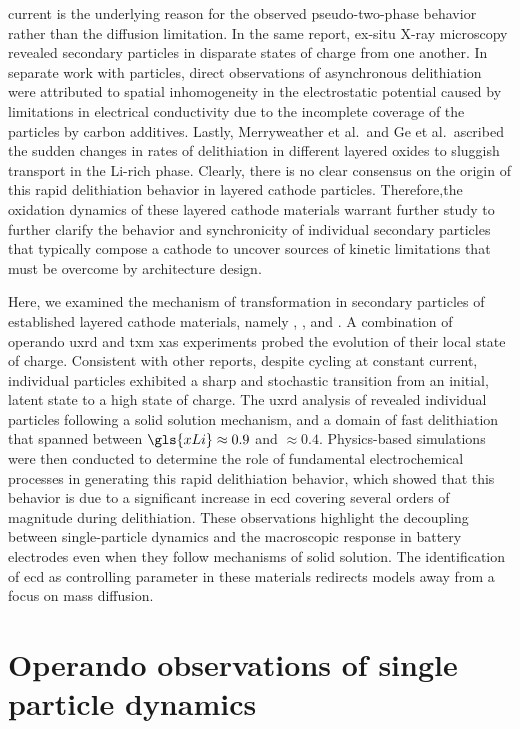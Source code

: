 \documentclass{article}
\begin{document}
current is the underlying reason for the observed pseudo-two-phase
behavior rather than the  diffusion limitation. In the same
report, ex-situ X-ray microscopy revealed secondary particles in
disparate states of charge from one another. In separate
work with \nmc[532]{} particles,\cite{zhao2022} direct observations of asynchronous delithiation were attributed to spatial inhomogeneity in the electrostatic
potential caused by limitations in electrical conductivity due to the incomplete coverage of
the particles by carbon additives. Lastly,
Merryweather et al.\cite{rao2021}\ and Ge et al.\cite{wang2020-6}\ ascribed the sudden changes in rates of delithiation in
different layered oxides to sluggish  transport in the Li-rich phase. Clearly, there is
no clear consensus on the origin of this rapid delithiation behavior
in layered cathode particles. Therefore,the oxidation dynamics of
these layered cathode materials warrant further study to further clarify the behavior and synchronicity of individual secondary
particles that typically compose a cathode to uncover sources of kinetic limitations that must be overcome by architecture design.


Here, we examined the mechanism of transformation
in secondary particles of established layered cathode materials,
namely \nca{}, \nmc[333]{}, and \nmc[532]{}. A combination of operando
\gls{uxrd} and \gls{txm} \gls{xas} experiments probed the
evolution of their local state of charge. Consistent with other reports, despite cycling at constant current, individual
particles exhibited a sharp and stochastic transition from an initial,
latent state to a high state of charge. The \gls{uxrd} analysis of \nca{} revealed individual particles following a solid solution mechanism, and a domain of fast delithiation that spanned between $\gls{xLi} \approx 0.9$ and $\approx 0.4$.  Physics-based
simulations were then conducted to determine the role of fundamental
electrochemical processes in generating this rapid delithiation
behavior, which showed that this behavior is due to a significant
increase in \gls{ecd} covering several orders of magnitude during
delithiation. These observations highlight the decoupling between
single-particle dynamics and the macroscopic response in battery
electrodes even when they follow mechanisms of solid solution. The
identification of \gls{ecd} as controlling parameter in these
materials redirects models away from a focus on mass diffusion.

\section{Operando observations of single particle dynamics}
\end{document}
